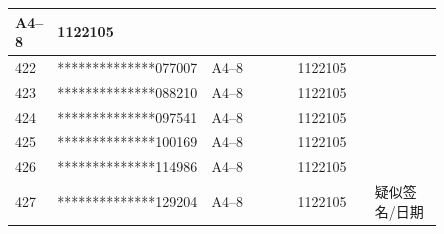 \documentclass[UTF8,10pt,a4paper,fontset=fandol]{ctexart}
\newcommand{\fieldvalue}[1]{#1}
\newcommand{\handwritten}[1]{#1}
\begin{document}
\begin{center}
\begin{tabular}{|p{0.07\linewidth}|p{0.24\linewidth}|p{0.20\linewidth}|p{0.18\linewidth}|p{0.16\linewidth}|}
\fieldvalue{A4--8} &
\fieldvalue{1122105} & \\
\hline
\fieldvalue{422} &
\fieldvalue{**************077007} &
\fieldvalue{A4--8} &
\fieldvalue{1122105} & \\
\hline
\fieldvalue{423} &
\fieldvalue{**************088210} &
\fieldvalue{A4--8} &
\fieldvalue{1122105} & \\
\hline
\fieldvalue{424} &
\fieldvalue{**************097541} &
\fieldvalue{A4--8} &
\fieldvalue{1122105} & \\
\hline
\fieldvalue{425} &
\fieldvalue{**************100169} &
\fieldvalue{A4--8} &
\fieldvalue{1122105} & \\
\hline
\fieldvalue{426} &
\fieldvalue{**************114986} &
\fieldvalue{A4--8} &
\fieldvalue{1122105} & \\
\hline
\fieldvalue{427} &
\fieldvalue{**************129204} &
\fieldvalue{A4--8} &
\fieldvalue{1122105} &
\fieldvalue{\handwritten{疑似签名/日期}} \\
\hline

\end{tabular}
\end{center}
\end{document}
